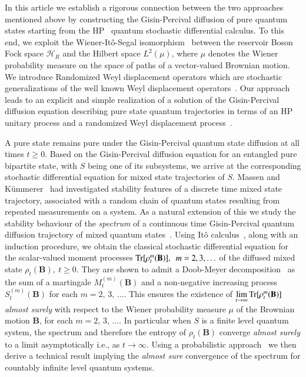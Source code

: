 In this article we establish a rigorous connection between the two approaches mentioned above by constructing the Gisin-Percival diffusion of pure quantum states starting from the HP~\cite{chap8-key7, chap8-key8}  quantum stochastic differential calculus. To this end, we exploit the Wiener-It{\^o}-Segal isomorphism~\cite{chap8-key32,chap8-key33,chap8-key34} between the reservoir Boson Fock space $\mathcal{H}_R$ and the Hilbert space $L^2(\mu)$, where $\mu$ denotes the Wiener probability measure on the space of paths of a vector-valued Brownian motion. We introduce Randomized Weyl displacement operators which are stochastic generalizations of the well known Weyl displacement operators~\cite{chap8-key8}.  Our approach leads to an explicit and simple realization of a solution of the Gisin-Percival diffusion equation  describing pure state quantum trajectories in terms of an HP unitary process and a randomized Weyl displacement process~\cite{chap8-key35}. 

A pure state remains pure under the Gisin-Percival quantum state diffusion at all times $t\geq 0$. Based on the Gisin-Percival diffusion equation for an entangled pure bipartite state, with $S$ being one of its subsystems, we arrive at the corresponding stochastic differential equation for mixed state trajectories of $S$. Massen and K{\"u}mmerer~\cite{chap8-key36} had  investigated  stability features of a discrete time mixed state trajectory, associated with a random chain of quantum states resulting from repeated measurements on a system. As a natural extension of this  we study the stability behaviour of the {\em spectrum} of a continuous time Gisin-Percival quantum diffusion trajectory of mixed quantum states~\cite{chap8-key37}. Using It{\^o} calculus~\cite{chap8-key38}, along with an induction procedure, we obtain the classical stochastic differential  equation for the scalar-valued moment processes  ${\rm Tr}[\rho_t^m( \mathbf{B})], \,\,\, m=2,3,\ldots$  of the diffused mixed state  $\rho_t(\mathbf{B}), \  t\geq 0$. They are shown to admit a Doob-Meyer decomposition~\cite{chap8-key39,chap8-key40} as the sum of a martingale $M^{(m)}_t(\mathbf{B})$ and a non-negative increasing process $S^{(m)}_t(\mathbf{B})$ for each $m=2,\, 3,\, \ldots$. This ensures the existence of  $\underset{t\rightarrow\infty}{\lim}\, {\rm Tr}[\rho_t^m( \mathbf{B})]$ {\em almost surely} with respect to the Wiener probability measure $\mu$ of the Brownian motion $\mathbf{B}$, for each $m=2,\, 3,\, \ldots$. In particular when  $S$ is a finite level quantum system, the spectrum and therefore the entropy of $\rho_t (\mathbf{B})$ converge {\em almost surely} to a limit asymptotically i.e., as $t\rightarrow \infty$. Using a probabilistic approach~\cite{chap8-key41,chap8-key42} we then derive a technical result implying the {\em almost sure} convergence of the spectrum for countably infinite level quantum systems. 

